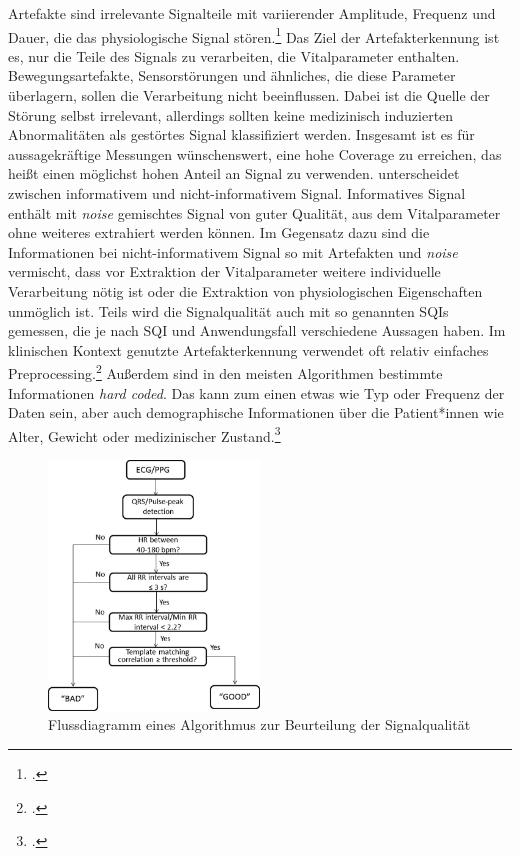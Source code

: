 	Artefakte sind irrelevante Signalteile mit variierender Amplitude, Frequenz und Dauer, die das physiologische Signal stören.\footcite[Vgl.][]{Nizami2013} Das Ziel der Artefakterkennung ist es, nur die Teile des Signals zu verarbeiten, die Vitalparameter enthalten. Bewegungsartefakte, Sensorstörungen und ähnliches, die diese Parameter überlagern, sollen die Verarbeitung nicht beeinflussen. Dabei ist die Quelle der Störung selbst irrelevant, allerdings sollten keine medizinisch induzierten Abnormalitäten als gestörtes Signal klassifiziert werden. Insgesamt ist es für aussagekräftige Messungen wünschenswert, eine hohe Coverage zu erreichen, das heißt einen möglichst hohen Anteil an Signal zu verwenden. \citeauthor{Sadek2016} unterscheidet zwischen informativem und nicht-informativem Signal. Informatives Signal enthält mit \textit{noise} gemischtes Signal von guter Qualität, aus dem Vitalparameter ohne weiteres extrahiert werden können. Im Gegensatz dazu sind die Informationen bei nicht-informativem Signal so mit Artefakten und \textit{noise} vermischt, dass vor Extraktion der Vitalparameter weitere individuelle Verarbeitung nötig ist oder die Extraktion von physiologischen Eigenschaften unmöglich ist. Teils wird die Signalqualität auch mit so genannten \acp{SQI} gemessen, die je nach \ac{SQI} und Anwendungsfall verschiedene Aussagen haben. Im klinischen Kontext genutzte Artefakterkennung verwendet oft relativ einfaches Preprocessing.\footcite[Vgl.][]{Nizami2013} Außerdem sind in den meisten Algorithmen bestimmte Informationen \textit{hard coded}. Das kann zum einen etwas wie Typ oder Frequenz der Daten sein, aber auch demographische Informationen über die Patient*innen wie Alter, Gewicht oder medizinischer Zustand.\footcite[Vgl.][]{Nizami2013}
		
	\begin{figure}[H]
		\centering
		\includegraphics[width=0.5\textwidth]{pic/ad_flussdiagramm}
		\caption[Flussdiagramm eines Algorithmus zur Beurteilung der Signalqualität]{Flussdiagramm eines Algorithmus zur Beurteilung der Signalqualität\protect\footnotemark}
		\label{fig:ecg-ad}
	\end{figure}
	
